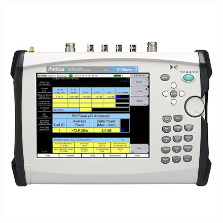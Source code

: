 \documentclass[a4paper,12pt]{report} %
\begin{document}
\begin{figure}[H]
	\centering
	\includegraphics{Imagenes/anritsu1}
\end{figure}

%
\end{document}

